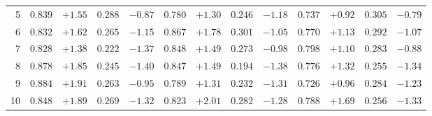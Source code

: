 \documentclass[11pt]{article}
\begin{document}
\begin{table}[ht]
\begin{tabular}{r cccc | cccc | cccc}
 5  & $\mathbf{0.839}$  & $\mathbf{+1.55}$  & $0.288$           & $-0.87$           & $0.780$           & $+1.30$           & $0.246$           & $-1.18$           & $0.737$           & $+0.92$           & $\mathbf{0.305}$  & $\mathbf{-0.79}$  \\
 6  & $0.832$           & $+1.62$           & $0.265$           & $-1.15$           & $\mathbf{0.867}$  & $\mathbf{+1.78}$  & $\mathbf{0.301}$  & $\mathbf{-1.05}$  & $0.770$           & $+1.13$           & $0.292$           & $-1.07$           \\
 7  & $0.828$           & $+1.38$           & $0.222$           & $-1.37$           & $\mathbf{0.848}$  & $\mathbf{+1.49}$  & $0.273$           & $-0.98$           & $0.798$           & $+1.10$           & $\mathbf{0.283}$  & $\mathbf{-0.88}$  \\
 8  & $\mathbf{0.878}$  & $\mathbf{+1.85}$  & $0.245$           & $-1.40$           & $0.847$           & $+1.49$           & $0.194$           & $-1.38$           & $0.776$           & $+1.32$           & $\mathbf{0.255}$  & $\mathbf{-1.34}$  \\
 9  & $\mathbf{0.884}$  & $\mathbf{+1.91}$  & $0.263$           & $\mathbf{-0.95}$  & $0.789$           & $+1.31$           & $0.232$           & $-1.31$           & $0.726$           & $+0.96$           & $\mathbf{0.284}$  & $-1.23$           \\
10  & $\mathbf{0.848}$  & $+1.89$           & $0.269$           & $-1.32$           & $0.823$           & $\mathbf{+2.01}$  & $\mathbf{0.282}$  & $\mathbf{-1.28}$  & $0.788$           & $+1.69$           & $0.256$           & $-1.33$           \\
\hline
\end{tabular}
\end{table}
\end{document}
